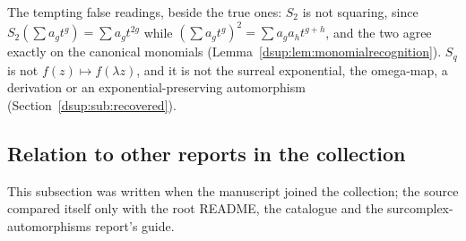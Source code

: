 \documentclass[11pt,oneside]{article}
\numberwithin{equation}{section}
\theoremstyle{definition}
\theoremstyle{remark}
\begin{document}
The tempting false readings, beside the true ones: $S_2$ is not squaring,
since $S_2(\sum a_gt^g)=\sum a_gt^{2g}$ while
$(\sum a_gt^g)^2=\sum a_ga_ht^{g+h}$, and the two agree exactly on the
canonical monomials (Lemma~\ref{dsup:lem:monomialrecognition}). $S_q$ is not
$f(z)\mapsto f(\lambda z)$, and it is not the surreal exponential, the
omega-map, a derivation or an exponential-preserving automorphism
(Section~\ref{dsup:sub:recovered}).

\subsection{Relation to other reports in the collection}\label{dsup:sec:position}

This subsection was written when the manuscript joined the collection; the
source compared itself only with the root README, the catalogue and the
surcomplex-automorphisms report's guide.
\end{document}
